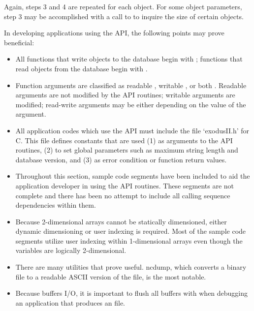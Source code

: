Again, steps 3 and 4 are repeated for each object. For some object
parameters, step 3 may be accomplished with a call to 
 to inquire the size of certain objects.


In developing applications using the \exo{} API, the following
points may prove beneficial:

\begin{itemize}

 \item All functions that write objects to the database begin with
 ; functions that read objects from
 the database begin with .

 \item Function arguments are classified as readable \R{}, writable
 \W{}, or both \RW{}. Readable arguments are not modified by the API
 routines; writable arguments are modified; read-write arguments may
 be either depending on the value of the argument.

 \item All application codes which use the \exo{} API must include
 the file `exodusII.h' for C. This file defines constants that are
 used (1) as arguments to the API routines, (2) to set global
 parameters such as maximum string length and database version, and
 (3) as error condition or function return values.

 \item Throughout this section, sample code segments have been
 included to aid the application developer in using the API
 routines. These segments are not complete and there has been no
 attempt to include all calling sequence dependencies within
 them.

 \item Because 2-dimensional arrays cannot be statically dimensioned,
 either dynamic dimensioning or user indexing is required. Most of the
 sample code segments utilize user indexing within 1-dimensional
 arrays even though the variables are logically 2-dimensional.

 \item There are many  utilities that prove useful. ncdump,
 which converts a binary  file to a readable ASCII version of
 the file, is the most notable.

 \item Because  buffers I/O, it is important to flush
 all buffers with  when debugging an
 application that produces an \exo{} file.
\end{itemize}

